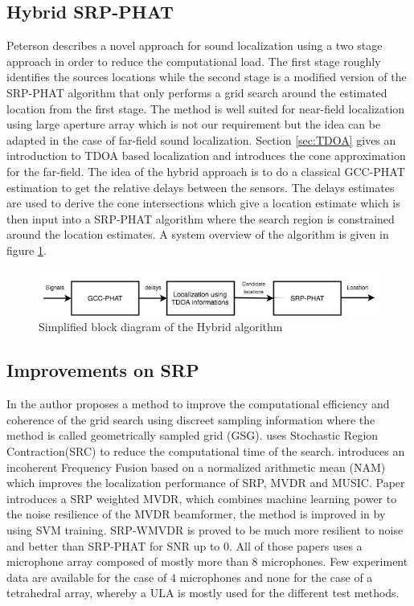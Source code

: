 \subsection{Hybrid SRP-PHAT}

Peterson \cite{peterson2005hybrid} describes a novel approach for sound localization using a two stage approach in order to reduce the computational load. The first stage roughly identifies the sources locations while the second stage is a modified version of the SRP-PHAT algorithm that only performs a grid search around the estimated location from the first stage.  The method is well suited for near-field localization using large aperture array which is not our requirement but the idea can be adapted in the case of far-field sound localization. Section \ref{sec:TDOA} gives an introduction to TDOA based localization and introduces the cone approximation for the far-field. The idea of the hybrid approach is to do a classical GCC-PHAT estimation to get the relative delays between the sensors. The delays estimates are used to derive the cone intersections which give a location estimate which is then input into a SRP-PHAT algorithm where the search region is constrained around the location estimates. A system overview of the algorithm is given in figure \ref{fig:hybridalgo}.

\begin{figure}[H]
    \centering
    \includegraphics[width=1\textwidth]{Figures/hybridalgo.png}
    \caption{Simplified block diagram of the Hybrid algorithm}
    \label{fig:hybridalgo}
\end{figure}

\subsection{Improvements on SRP}

In \cite{salvati2017exploiting} the author proposes a method to improve the computational efficiency and coherence of the grid search using discreet sampling information where the method is called geometrically sampled grid (GSG). \cite{do2007real} uses Stochastic Region Contraction(SRC) to reduce the computational time of the search. \cite{salvati2014incoherent} introduces an incoherent Frequency Fusion based on a normalized arithmetic mean (NAM) which improves the localization performance of SRP, MVDR and MUSIC. Paper \cite{salvati2015frequency} introduces a SRP weighted MVDR, which combines machine learning power to the noise resilience of the MVDR beamformer, the method is improved in \cite{salvati2016use} by using SVM training. SRP-WMVDR is proved to be much more resilient to noise and better than SRP-PHAT for SNR up to 0. All of those papers uses a microphone array composed of mostly more than 8 microphones. Few experiment data are available for the case of 4 microphones and none for the case of a tetrahedral array, whereby a ULA is mostly used for the different test methods.


